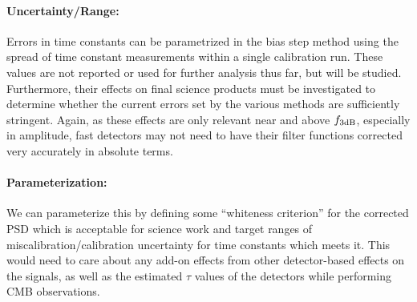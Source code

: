 \paragraph{Uncertainty/Range:}
Errors in time constants can be parametrized in the bias step method using the spread of time constant measurements within a single calibration run. These values are not reported or used for further analysis thus far, but will be studied. Furthermore, their effects on final science products must be investigated to determine whether the current errors set by the various methods are sufficiently stringent. Again, as these effects are only relevant near and above $f_{\mbox{\scriptsize 3dB}}$, especially in amplitude, fast detectors may not need to have their filter functions corrected very accurately in absolute terms.

\paragraph{Parameterization:}
We can parameterize this by defining some ``whiteness criterion'' for the corrected PSD which is acceptable for science work and target ranges of miscalibration/calibration uncertainty for time constants which meets it. This would need to care about any add-on effects from other detector-based effects on the signals, as well as the estimated $\tau$ values of the detectors while performing CMB observations.

